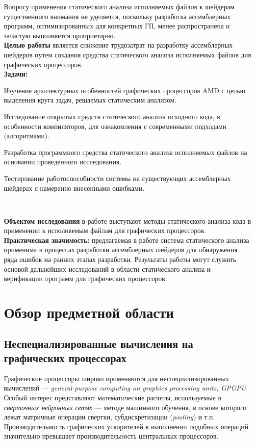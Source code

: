 \documentclass[a4paper,14pt]{extarticle}
\begin{document}
Вопросу применения статического анализа исполняемых файлов к шейдерам существенного внимания
не уделяется, поскольку разработка ассемблерных программ, оптимизированных для конкретных ГП,
менее распространена и зачастую выполняется проприетарно.\\

\textbf{Целью работы} является снижение трудозатрат на разработку ассемблерных шейдеров
путем создания средства статического анализа исполняемых файлов для графических процессоров.\\

\textbf{Задачи:}
\begin{ul}
\item Изучение архитектурных особенностей графических процессоров AMD с целью выделения
круга задач, решаемых статическим анализом.
\item Исследование открытых средств статического анализа исходного кода, в особенности
компиляторов, для ознакомления с современными подходами (алгоритмами).
\item Разработка программного средства статического анализа исполняемых файлов
на основании проведенного исследования.
\item Тестирование работоспособности системы на существующих ассемблерных шейдерах
с намеренно внесенными ошибками.
\end{ul}\ %

\textbf{Объектом исследования} в работе выступают методы статического анализа кода
в применении к исполняемым файлам для графических процессоров.\\

\textbf{Практическая значимость:} предлагаемая в работе система
статического анализа применима в процессах разработки ассемблерных шейдеров
для обнаружения ряда ошибок на ранних этапах разработки. Результаты работы
могут служить основой дальнейших исследований в области статического анализа
и верификации программ для графических процессоров.

\newpage
\section{Обзор предметной области}

\subsection{Неспециализированные вычисления на графических процессорах}

Графические процессоры широко применяются для неспециализированных вычислений —
\textit{general-purpose computing on graphics processing units, GPGPU}.
Особый интерес представляют математические расчеты, используемые в
\textit{сверточных нейронных сетях} — методе машинного обучения, в основе которого
лежат матричные операции свертки, субдискретизации (\textit{pooling}) и т.п.
Производительность графических ускорителей в выполнении подобных операций
значительно превышает производительность центральных процессоров.\\
\end{document}
